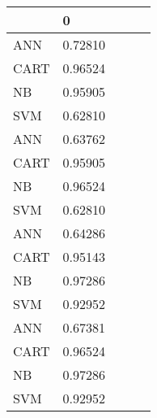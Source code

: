 \begin{tabular}{|l|l|l|l|l|}
\toprule
{} &       0 \\
\midrule
ANN  & 0.72810 \\
CART & 0.96524 \\
NB   & 0.95905 \\
SVM  & 0.62810 \\
ANN  & 0.63762 \\
CART & 0.95905 \\
NB   & 0.96524 \\
SVM  & 0.62810 \\
ANN  & 0.64286 \\
CART & 0.95143 \\
NB   & 0.97286 \\
SVM  & 0.92952 \\
ANN  & 0.67381 \\
CART & 0.96524 \\
NB   & 0.97286 \\
SVM  & 0.92952 \\
\bottomrule
\end{tabular}
